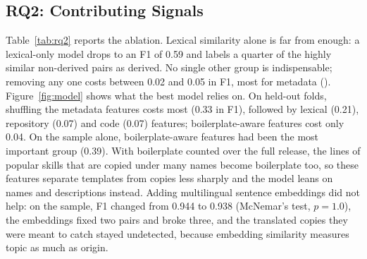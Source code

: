 \documentclass[sigconf,screen]{acmart}
\begin{document}
\subsection{RQ2: Contributing Signals}
\label{sec:rq2}

\begin{table}[t]
\caption{RQ2: ablation of feature groups for our best model.}
\label{tab:rq2}
\small
{}
\end{table}

Table~\ref{tab:rq2} reports the ablation. Lexical similarity alone is far from enough: a lexical-only model drops to an F1 of 0.59 and labels a quarter of the highly similar non-derived pairs as derived. No single other group is indispensable; removing any one costs between 0.02 and 0.05 in F1, most for metadata (\ResTopAblationDrop{}). Figure~\ref{fig:model} shows what the best model relies on. On held-out folds, shuffling the metadata features costs most (0.33 in F1), followed by lexical (0.21), repository (0.07) and code (0.07) features; boilerplate-aware features cost only 0.04. On the sample alone, boilerplate-aware features had been the most important group (0.39). With boilerplate counted over the full release, the lines of popular skills that are copied under many names become boilerplate too, so these features separate templates from copies less sharply and the model leans on names and descriptions instead. Adding multilingual sentence embeddings did not help: on the sample, F1 changed from 0.944 to 0.938 (McNemar's test, $p = 1.0$), the embeddings fixed two pairs and broke three, and the translated copies they were meant to catch stayed undetected, because embedding similarity measures topic as much as origin.
\end{document}
